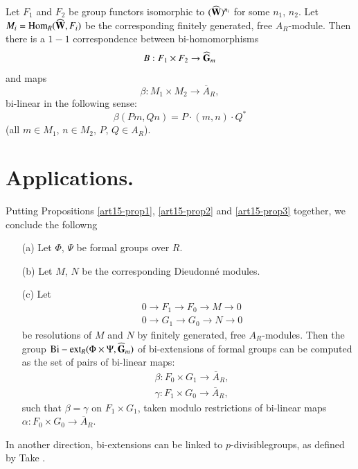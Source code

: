 \begin{coro*}
Let $F_{1}$ and $F_{2}$ be group functors isomorphic to $(\widehat{\mathbf{W}})^{n_{i}}$ for some $n_{1}$, $n_{2}$. Let $M_{i}=\operatorname{\mathrm{Hom}}_{R}(\widehat{\mathbf{W}},F_{i})$ be the corresponding finitely generated, free $A_{R}$-module. Then there is a $1-1$ correspondence between bi-homomorphisms
$$
B:F_{1}\times F_{2}\to \widehat{\mathbf{G}}_{m}
$$
and maps
$$
\beta : M_{1}\times M_{2}\to \overline{A}_{R},
$$\pageoriginale
bi-linear in the following sense:
$$
\beta (Pm,Qn)=P\cdot (m,n)\cdot Q^{*}
$$
(all $m\in M_{1}$, $n\in M_{2}$, $P$, $Q\in A_{R}$).
\end{coro*}

\section{Applications.}\label{art15-sec5}

Putting Propositions \ref{art15-prop1}, \ref{art15-prop2} and \ref{art15-prop3} together, we conclude the followng

\begin{coro*}
\begin{itemize}
\item[(a)] Let $\Phi$, $\Psi$ be formal groups over $R$.

\item[(b)] Let $M$, $N$ be the corresponding Dieudonn\'e modules.

\item[(c)] Let
\begin{align*}
& 0\to F_{1}\to F_{0}\to M\to 0\\
& 0\to G_{1}\to G_{0}\to N\to 0
\end{align*}
be resolutions of $M$ and $N$ by finitely generated, free $A_{R}$-modules. Then the group ${\rm Bi-ext}_{R}(\Phi\times \Psi, \widehat{\mathbf{G}}_{m})$ of bi-extensions of formal groups can be computed as the set of pairs of bi-linear maps:
\begin{align*}
& \beta : F_{0}\times G_{1}\to \overline{A}_{R},\\
& \gamma : F_{1}\times G_{0}\to \overline{A}_{R},
\end{align*}
such that $\beta=\gamma$ on $F_{1}\times G_{1}$, taken modulo restrictions of bi-linear maps $\alpha : F_{0}\times G_{0}\to \overline{A}_{R}$.
\end{itemize}
\end{coro*}

In another direction, bi-extensions can be linked to $p$-divisible\break groups, as defined by Take \cite{art15-key6}.

